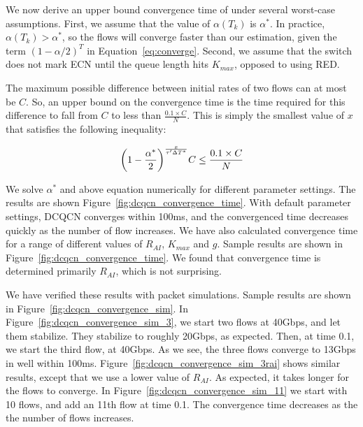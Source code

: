 We now derive an upper bound convergence time of under several worst-case
assumptions. First, we assume that the value of $\alpha ({T_k})$ is $\alpha ^*$.
In practice, $\alpha ({T_k}) > \alpha ^*$, so the flows will converge faster
than our estimation, given the term $(1 - \alpha /2)^T$ in
Equation~\ref{eq:converge}.  Second, we assume that the switch does not mark ECN
until the queue length hits $K_{max}$, opposed to using RED. 

The maximum possible difference between initial rates of two flows can at most
be $C$. So, an upper bound on the convergence time is the time required for this
difference to fall from $C$ to less than $\frac{0.1 \times C}{N}$. This is
simply the smallest value of $x$ that satisfies the following inequality: 

\begin{equation} 
\small 
{ \left( {1 - \frac{{{\alpha ^*}}}{2}} \right)^{\frac{x}{{\tau '\Delta{T^*}}}}}C \le \frac{0.1 \times C}{N} 
\end{equation}

We solve $\alpha^*$ and above equation numerically for different parameter settings. The results are
shown Figure~\ref{fig:dcqcn_convergence_time}. With default parameter settings,
DCQCN converges within 100ms, and the convergenced time decreases quickly as the
number of flow increases.  We have also calculated convergence time for a range
of different values of $R_{AI}$, $K_{max}$ and $g$. Sample results are shown in
Figure~\ref{fig:dcqcn_convergence_time}. We found that convergence time is
determined primarily $R_{AI}$, which is not surprising.

We have verified these results with packet simulations. Sample results are shown
in Figure~\ref{fig:dcqcn_convergence_sim}. In
Figure~\ref{fig:dcqcn_convergence_sim_3}, we start two flows at 40Gbps, and let
them stabilize. They stabilize to roughly 20Gbps, as expected. Then, at time
0.1, we start the third flow, at 40Gbps. As we see, the three flows converge to
13Gbps in well within 100ms. Figure~\ref{fig:dcqcn_convergence_sim_3rai} shows
similar results, except that we use a lower value of $R_{AI}$. As expected, it
takes longer for the flows to converge. In
Figure~\ref{fig:dcqcn_convergence_sim_11} we start with 10 flows, and add an
11th flow at time 0.1. The convergence time decreases as the the number of flows
increases.








